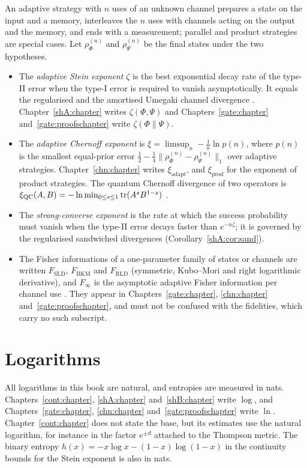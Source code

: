 An adaptive strategy with $n$ uses of an unknown channel prepares a state on the input and a memory, interleaves the $n$ uses with channels acting on the output and the memory, and ends with a measurement; parallel and product strategies are special cases. Let $\rho^{(n)}_\Phi$ and $\rho^{(n)}_\Psi$ be the final states under the two hypotheses.
\begin{itemize}
\item The \emph{adaptive Stein exponent} $\zeta$ is the best exponential decay rate of the type-II error when the type-I error is required to vanish asymptotically. It equals the regularised and the amortised Umegaki channel divergence \cite{WangWilde2019,FFRS2020}. Chapter~\ref{shA:chapter} writes $\zeta(\Phi,\Psi)$ and Chapters~\ref{gate:chapter} and~\ref{gate:proofschapter} write $\zeta(\Phi\|\Psi)$.
\item The \emph{adaptive Chernoff exponent} is $\xi=\limsup_n-\frac1n\ln p(n)$, where $p(n)$ is the smallest equal-prior error $\frac12-\frac14\|\rho^{(n)}_\Phi-\rho^{(n)}_\Psi\|_1$ over adaptive strategies. Chapter~\ref{chn:chapter} writes $\xi_{\mathrm{adapt}}$, and $\xi_{\mathrm{prod}}$ for the exponent of product strategies. The quantum Chernoff divergence of two operators is $\xi_{\mathrm{QC}}(A,B)=-\ln\min_{0\le s\le1}\operatorname{tr}(A^sB^{1-s})$ \cite{AudenaertChernoff2007,NussbaumSzkola2009}.
\item The \emph{strong-converse exponent} is the rate at which the success probability must vanish when the type-II error decays faster than $e^{-n\zeta}$; it is governed by the regularised sandwiched divergences (Corollary~\ref{shA:cor:sand}).
\item The Fisher informations of a one-parameter family of states or channels are written $F_{\mathrm{SLD}}$, $F_{\mathrm{BKM}}$ and $F_{\mathrm{RLD}}$ (symmetric, Kubo--Mori and right logarithmic derivative), and $F_\infty$ is the asymptotic adaptive Fisher information per channel use \cite{ZhouJiang2021}. They appear in Chapters~\ref{gate:chapter}, \ref{chn:chapter} and~\ref{gate:proofschapter}, and must not be confused with the fidelities, which carry no such subscript.
\end{itemize}

\section{Logarithms}\label{nt:sec:log}

All logarithms in this book are natural, and entropies are measured in nats. Chapters~\ref{cont:chapter}, \ref{shA:chapter} and~\ref{shB:chapter} write $\log$, and Chapters~\ref{gate:chapter}, \ref{chn:chapter} and~\ref{gate:proofschapter} write $\ln$. Chapter~\ref{cont:chapter} does not state the base, but its estimates use the natural logarithm, for instance in the factor $e^{\pm d}$ attached to the Thompson metric. The binary entropy $h(x)=-x\log x-(1-x)\log(1-x)$ in the continuity bounds for the Stein exponent is also in nats.

